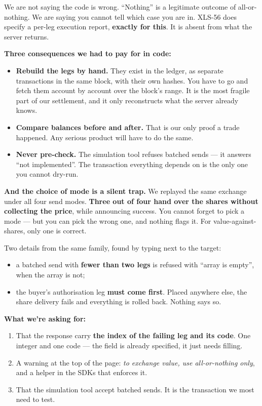 \documentclass[10pt,a4paper]{article}
\begin{document}
We are not saying the code is wrong. ``Nothing'' is a legitimate outcome of all-or-nothing. We are saying you cannot tell which case you are in. XLS-56 does specify a per-leg execution report, \textbf{exactly for this}. It is absent from what the server returns.

\textbf{Three consequences we had to pay for in code:}

\begin{itemize}
  \item \textbf{Rebuild the legs by hand.} They exist in the ledger, as separate transactions in the same block, with their own hashes. You have to go and fetch them account by account over the block's range. It is the most fragile part of our settlement, and it only reconstructs what the server already knows.
  \item \textbf{Compare balances before and after.} That is our only proof a trade happened. Any serious product will have to do the same.
  \item \textbf{Never pre-check.} The simulation tool refuses batched sends --- it answers ``not implemented''. The transaction everything depends on is the only one you cannot dry-run.
\end{itemize}

\textbf{And the choice of mode is a silent trap.} We replayed the same exchange under all four send modes. \textbf{Three out of four hand over the shares without collecting the price}, while announcing success. You cannot forget to pick a mode --- but you can pick the wrong one, and nothing flags it. For value-against-shares, only one is correct.

Two details from the same family, found by typing next to the target:

\begin{itemize}
  \item a batched send with \textbf{fewer than two legs} is refused with ``array is empty'', when the array is not;
  \item the buyer's authorisation leg \textbf{must come first}. Placed anywhere else, the share delivery fails and everything is rolled back. Nothing says so.
\end{itemize}

\textbf{What we're asking for:}

\begin{enumerate}
  \item That the response carry \textbf{the index of the failing leg and its code}. One integer and one code --- the field is already specified, it just needs filling.
  \item A warning at the top of the page: \emph{to exchange value, use all-or-nothing only}, and a helper in the SDKs that enforces it.
  \item That the simulation tool accept batched sends. It is the transaction we most need to test.
\end{enumerate}
\end{document}
